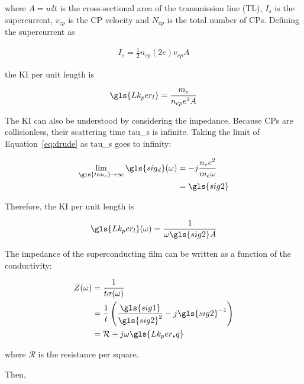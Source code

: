 where $A = wlt$ is the cross-sectional area of the transmission line (TL), $I_{s}$ is the supercurrent, $v_{cp}$ is the CP velocity and $N_{cp}$ is the total number of CPs. Defining the supercurrent as

\begin{equation}
  \begin{aligned}
  I_{s} = \frac{1}{2}n_{cp}(2e)v_{cp}A
  \end{aligned}
\end{equation}

the KI per unit length is

\begin{equation} \label{eq:KI_per_length}
  \gls{Lk_per_l} = \frac{m_{e}}{n_{cp}e^{2}A}
\end{equation}

The KI can also be understood by considering the impedance. Because CPs are collisionless, their scattering time \gls{tau_s} is infinite. Taking the limit of Equation~\ref{eq:drude} as \gls{tau_s} goes to infinity:

\begin{equation}
    \begin{aligned}
    \lim_{\gls{tau_s} \to \infty} \gls{sig_d}(\omega) &= -j\frac{n_{e}e^{2}}{m_{e}\omega}\\
    &= \gls{sig2}
    \end{aligned}
\end{equation}

Therefore, the KI per unit length is

\begin{equation}
  \gls{Lk_per_l}(\omega) = \frac{1}{\omega \gls{sig2} A}
\end{equation}

The impedance of the superconducting film can be written as a function of the conductivity:

\begin{equation}\label{eq:Z}
  \begin{aligned}
  Z(\omega) &= \frac{1}{t\sigma(\omega)}\\
            &= \frac{1}{t}\left( \frac{\gls{sig1}}{\gls{sig2}^{2}} - j\gls{sig2}^{-1}\right)\\
            &= \mathcal{R} + j\omega\gls{Lk_per_sq}
  \end{aligned}
\end{equation}

where $\mathcal{R}$ is the resistance per square.

Then,

